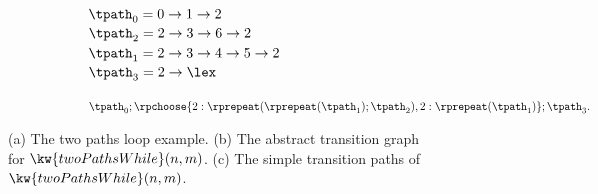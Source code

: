 {\begin{figure}
\begin{subfigure}{.71\textwidth}
{\small
\begin{subfigure}{.3\textwidth}
\begin{centering}
    $\tpath_0 = 0 \to 1 \to 2$ \\
    $\tpath_2 = 2 \to 3 \to 6 \to 2$ \\ 
    $\tpath_1 = 2 \to 3 \to 4 \to 5 \to 2$ \\
    $\tpath_3 = 2 \to \lex$
    \caption{}
\end{centering}
\end{subfigure}
}
{\small
\begin{subfigure}{.8\textwidth}
\begin{centering}
$
\tpath_0 ; 
\rpchoose{2: \rprepeat(\rprepeat(\tpath_1); \tpath_2), 
2: \rprepeat(\tpath_1)}; \tpath_3.
$
\end{centering}
\end{subfigure}
}
\end{subfigure}
\caption{
(a) The two paths loop example.
(b) The abstract transition graph for $\kw{twoPathsWhile}(n, m)$.
(c) The simple transition paths of $\kw{twoPathsWhile}(n, m)$.}
    \label{fig:whileTwoCounters-overview}
\end{figure}
}


